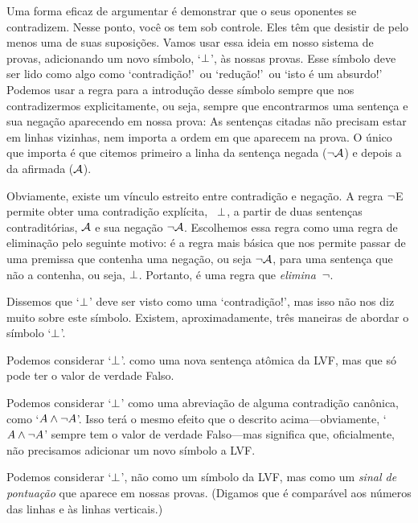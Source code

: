 Uma forma eficaz de argumentar \'e demonstrar que o seus oponentes se contradizem. Nesse ponto, voc\^e os tem sob controle. Eles t\^em que desistir de pelo menos uma de suas suposi\c c\~oes. Vamos usar essa ideia em nosso sistema de provas, adicionando um novo s\'imbolo, `$\bot$', \`as nossas provas. Esse s\'imbolo deve ser lido como algo como `contradi\c c\~ao!'\ ou `redu\c c\~ao!'\ ou `isto \'e um absurdo!'  Podemos usar   a regra para a introdu\c c\~ao desse s\'imbolo sempre que nos contradizermos explicitamente, ou seja, sempre que encontrarmos uma senten\c ca e sua nega\c c\~ao aparecendo em nossa prova:
As sentenças citadas não precisam estar em linhas vizinhas, nem importa a ordem em que aparecem na prova. O único que importa é que citemos primeiro a linha da sentença negada ($\neg\mathcal{A}$) e depois a da afirmada ($\mathcal{A}$). 


Obviamente, existe um v\'inculo estreito entre contradi\c c\~ao e nega\c c\~ao. 
A regra $\neg$E permite obter uma contradi\c c\~ao expl\'icita, ~$\bot$,  
 a partir de duas senten\c cas contradit\'orias, $\mathcal{A}$ e sua nega\c c\~ao $\neg \mathcal{A}$. 
Escolhemos essa regra como uma regra de elimina\c c\~ao pelo seguinte  motivo: \'e a regra mais b\'asica que nos permite passar de uma premissa que contenha uma nega\c c\~ao, ou seja $\neg\mathcal{A}$, 
para uma senten\c ca que n\~ao a contenha, ou seja,  $\bot$.  Portanto, \'e uma regra que \emph{elimina}~$\neg$.


Dissemos que  `$\bot$'  deve ser visto como uma  `contradi\c c\~ao!', mas isso n\~ao nos diz muito sobre este s\'imbolo. Existem, aproximadamente, tr\^es maneiras de abordar o s\'imbolo `$\bot$'.
	\begin{ebullet}
		\item Podemos considerar `$\bot$'. como uma nova senten\c ca at\^omica da LVF, mas que s\'o pode ter o valor de verdade Falso.  
		\item Podemos considerar  `$\bot$' como uma abrevia\c c\~ao de alguma contradi\c c\~ao can\^onica, como `$A \wedge \neg A$'. Isso ter\'a o mesmo efeito que o descrito acima---obviamente, `$A \wedge \neg A$' sempre tem o valor de verdade Falso---mas significa que, oficialmente, n\~ao precisamos adicionar um novo s\'imbolo a LVF.
		\item Podemos considerar `$\bot$', n\~ao como um s\'imbolo da LVF, mas como um \emph{sinal de pontua\c c\~ao} que aparece em nossas provas.  (Digamos que \'e compar\'avel aos n\'umeros das linhas e \`as linhas verticais.)
			\end{ebullet}
			
